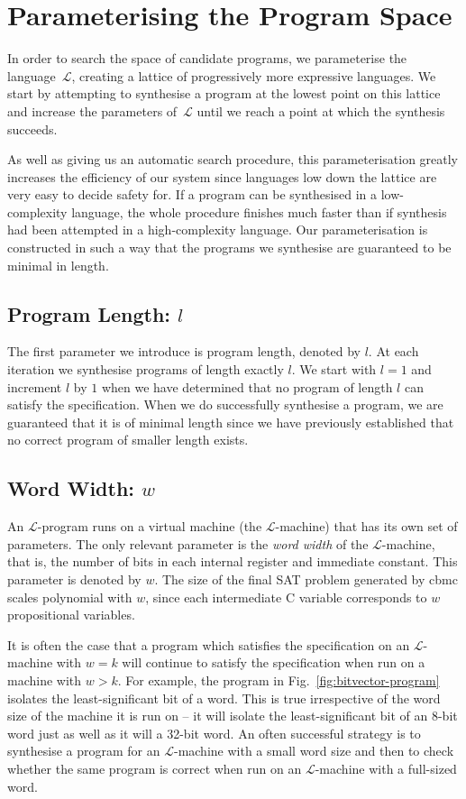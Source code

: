 \documentclass[a4paper]{llncs}
\begin{document}
\section{Parameterising the Program Space}
In order to search the space of candidate programs, we parameterise
the language~$\mathcal{L}$, creating a lattice of progressively
more expressive languages.  We start by attempting to synthesise
a program at the lowest point on this lattice and increase the
parameters of~$\mathcal{L}$ until we reach a point at which
the synthesis succeeds.

As well as giving us an automatic search procedure, this parameterisation
greatly increases the efficiency of our system since languages
low down the lattice are very easy to decide safety for.  If a program
can be synthesised in a low-complexity language, the whole procedure
finishes much faster than if synthesis had been attempted in a
high-complexity language.  Our parameterisation is constructed
in such a way that the programs we synthesise are guaranteed to be
minimal in length.

\subsection{Program Length: $l$}
The first parameter we introduce is program length, denoted by $l$.
At each iteration we synthesise programs of length exactly $l$.
We start with $l = 1$ and increment $l$ by $1$ when we have determined
that no program of length $l$ can satisfy the specification.  When we do
successfully synthesise a program, we are guaranteed that it
is of minimal length since we have previously established that no
correct program of smaller length exists.


\subsection{Word Width: $w$}
An $\mathcal{L}$-program runs on a virtual machine (the $\mathcal{L}$-machine) that
has its own set of parameters.  The only relevant parameter is
the \emph{word width} of the $\mathcal{L}$-machine, that is, the number of bits
in each internal register and immediate constant.  This parameter is denoted by
$w$.  The size of the final SAT problem generated by {\sc cbmc} scales
polynomial with $w$, since each intermediate C variable corresponds
to $w$ propositional variables.

It is often the case that a program which satisfies the specification
on an $\mathcal{L}$-machine with $w = k$ will continue to satisfy the
specification when run on a machine with $w > k$.  For example, the program
in Fig.~\ref{fig:bitvector-program} isolates the least-significant bit of a word.
This is true irrespective of the word size of the machine it is run on -- it will
isolate the least-significant bit of an 8-bit word just as well as it will a
32-bit word.  An often successful strategy is to synthesise a program for an
$\mathcal{L}$-machine with a small word size and then to check whether the
same program is correct when run on an $\mathcal{L}$-machine with a
full-sized word.
\end{document}
